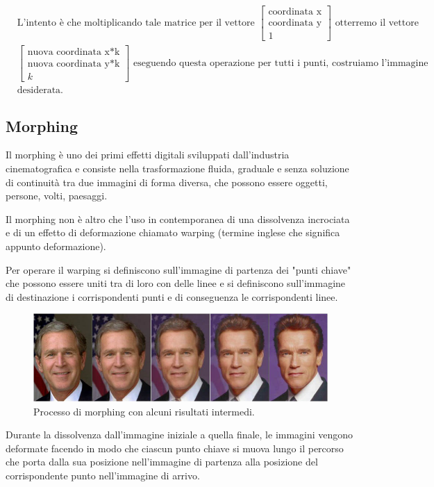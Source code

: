 \vspace{1em}

\begin{align*}
&\text{L'intento è che moltiplicando tale matrice per il vettore  }
\begin{bmatrix}
\text{coordinata x}\\
\text{coordinata y}\\
1
\end{bmatrix}
\text{ otterremo il vettore}\\
&\begin{bmatrix}
\text{nuova coordinata x*k}\\
\text{nuova coordinata y*k}\\
k
\end{bmatrix}
\text{ eseguendo questa operazione per tutti i punti, costruiamo l'immagine}\\
&\text{desiderata.}
\end{align*}

\subsection{Morphing}
Il morphing è uno dei primi effetti digitali sviluppati dall'industria cinematografica e consiste nella trasformazione fluida, graduale e senza soluzione di continuità tra due immagini di forma diversa, che possono essere oggetti, persone, volti, paesaggi.

\vspace{1em} \noindent
Il morphing non è altro che l'uso in contemporanea di una dissolvenza incrociata e di un effetto di deformazione chiamato warping (termine inglese che significa appunto deformazione).

\vspace{1em} \noindent
Per operare il warping si definiscono sull'immagine di partenza dei "punti chiave" che possono essere uniti tra di loro con delle linee e si definiscono sull'immagine di destinazione i corrispondenti punti e di conseguenza le corrispondenti linee.\\ 
\begin{figure}[htb] \centering
\includegraphics[scale=0.5, trim = 0 1.1cm 0 0, clip]{Pictures/Striscia_morphing.jpg}
\caption{Processo di morphing con alcuni risultati intermedi.}\label{fig:figura}
\end{figure}

\noindent
Durante la dissolvenza dall'immagine iniziale a quella finale, le immagini vengono deformate facendo in modo che ciascun punto chiave si muova lungo il percorso che porta dalla sua posizione nell'immagine di partenza alla posizione del corrispondente punto nell'immagine di arrivo. 
